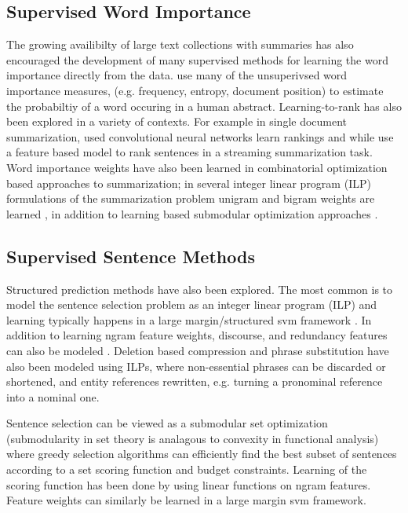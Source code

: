 \subsection{Supervised Word Importance}

The growing availibilty of large text collections with summaries has also
encouraged the development of many supervised methods for learning the word 
importance 
directly from the data. \cite{Regsum} use many of the unsuperivsed word  
importance measures, (e.g. frequency, entropy, document position) to estimate
the probabiltiy of a word occuring in a human abstract. Learning-to-rank
has also been explored in a variety of contexts. For example in single
document summarization, \cite{lapata} used convolutional neural networks
learn rankings and while \cite{guo,macreadie} use a feature based model
to rank sentences in a streaming summarization task.
Word importance weights have also been learned in combinatorial optimization
based approaches to summarization; in several integer linear program (ILP)
formulations of the summarization problem unigram and bigram weights 
are learned \cite{gillick,martens,berkely}, in addition to learning based
submodular optimization approaches \cite{submod,svm}.




\subsection{Supervised Sentence Methods}


Structured prediction methods have also been explored. The most common is
to model the sentence selection problem as an integer linear program (ILP)
and learning typically happens in a large margin/structured svm framework 
\cite{durret}. In addition to learning ngram feature weights, discourse,
and redundancy features can also be modeled \cite{somebody}. 
Deletion based compression 
and phrase substitution have also been modeled using ILPs, where non-essential
phrases can be discarded or shortened, and entity references rewritten, e.g.
turning a pronominal reference into a nominal one.

Sentence selection can be viewed as a submodular set optimization 
(submodularity in set theory is analagous to convexity in functional analysis)
where greedy selection algorithms can efficiently find the best subset of 
sentences according to a set scoring function and budget constraints.
Learning of the scoring function has been done by \cite{uwsipos} using 
linear functions on ngram features. Feature weights can similarly be learned 
in a large margin svm framework.


